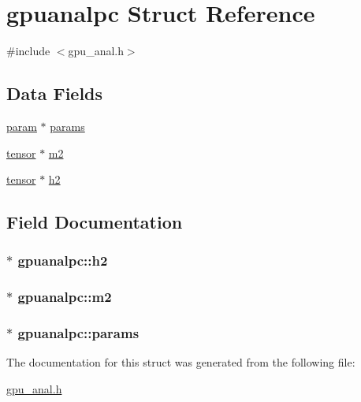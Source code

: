 \hypertarget{structgpuanalpc}{
\section{gpuanalpc Struct Reference}
\label{structgpuanalpc}
}


{\ttfamily \#include $<$gpu\_\-anal.h$>$}

\subsection*{Data Fields}
\begin{DoxyCompactItemize}
\item 
\hyperlink{structparam}{param} $\ast$ \hyperlink{structgpuanalpc_a7855095da15e38940a0b7022c2e2ce6d}{params}
\item 
\hyperlink{structtensor}{tensor} $\ast$ \hyperlink{structgpuanalpc_adc98404b1d68023d659ef606cf13de75}{m2}
\item 
\hyperlink{structtensor}{tensor} $\ast$ \hyperlink{structgpuanalpc_a6df36da264dc3e4d83b327a5e44258e7}{h2}
\end{DoxyCompactItemize}


\subsection{Field Documentation}
\hypertarget{structgpuanalpc_a6df36da264dc3e4d83b327a5e44258e7}{
\subsubsection[{h2}]{$\ast$ {\bf gpuanalpc::h2}}}
\label{structgpuanalpc_a6df36da264dc3e4d83b327a5e44258e7}
\hypertarget{structgpuanalpc_adc98404b1d68023d659ef606cf13de75}{
\subsubsection[{m2}]{$\ast$ {\bf gpuanalpc::m2}}}
\label{structgpuanalpc_adc98404b1d68023d659ef606cf13de75}
\hypertarget{structgpuanalpc_a7855095da15e38940a0b7022c2e2ce6d}{
\subsubsection[{params}]{$\ast$ {\bf gpuanalpc::params}}}
\label{structgpuanalpc_a7855095da15e38940a0b7022c2e2ce6d}


The documentation for this struct was generated from the following file:\begin{DoxyCompactItemize}
\item 
\hyperlink{gpu__anal_8h}{gpu\_\-anal.h}\end{DoxyCompactItemize}
